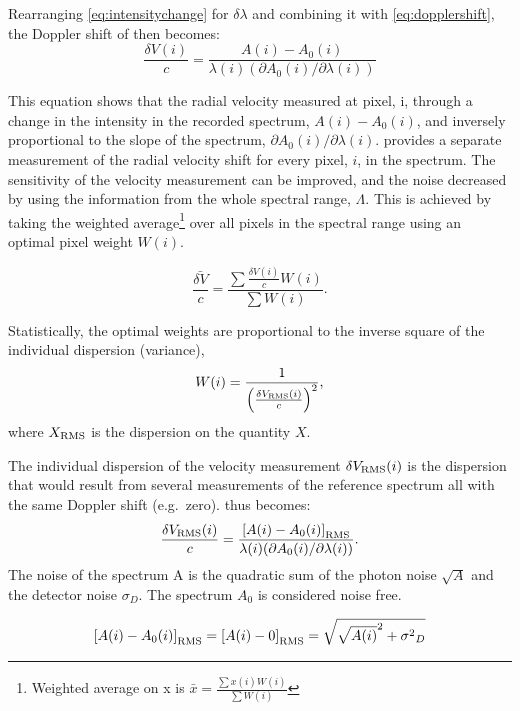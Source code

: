 Rearranging \cref{eq:intensitychange} for \(\delta \lambda\) and combining it with \cref{eq:dopplershift}, the Doppler shift of then becomes:
\begin{equation}
    \frac{\delta V(i)}{c} = \frac{A(i) - A_0(i) }{\lambda(i) (\partial A_0(i)/\partial \lambda(i))} \label{eq:delta_v_i}
\end{equation}

This equation shows that the radial velocity measured at pixel, i, through a change in the intensity in the recorded spectrum, \(A(i)-A_0(i)\), and inversely proportional to the slope of the spectrum, \({\partial A_0(i)}/{\partial \lambda(i)}\).
 provides a separate measurement of the radial velocity shift for every pixel, $i$, in the spectrum.
The sensitivity of the velocity measurement can be improved, and the noise decreased by using the information from the whole  spectral range, \(\Lambda\).
This is achieved by taking the weighted average\footnote{Weighted average on x is \(\bar{x} = \frac{\sum{ x(i)W(i)}}{\sum {W(i)}}\)} over all pixels in the spectral range using an optimal pixel weight \(W(i)\).

\begin{equation}
\bar{\frac{\delta V}{c}} = \frac{\sum{\frac{\delta V(i)}{c}W(i)}}{\sum {W(i)}}.
\end{equation}

Statistically, the optimal weights are proportional to the inverse square of the individual dispersion (variance),
\begin{equation}
W(i) = \frac{1}{{\left(\frac{\delta V_{\textrm{RMS}}(i)}{c}\right)}^{2}}, \label{eq:weights}
\end{equation}
where \(X_{\textrm{RMS}}\) is the dispersion on the quantity \(X\).

The individual dispersion of the velocity measurement \(\delta V_{\textrm{RMS}}(i)\) is the dispersion that would result from several measurements of the reference spectrum all with the same Doppler shift (e.g.\ zero).  thus becomes:
\begin{equation}
    \frac{\delta V_{\textrm{RMS}}(i)}{c} = \frac{{[A(i) - A_0(i)]}_{\textrm{RMS}} }{\lambda(i) (\partial A_0(i)/\partial \lambda(i))}. \label{eq:delta_v_i_rms}
\end{equation}
The noise of the spectrum A is the quadratic sum of the photon noise \(\sqrt{A}\) and the detector noise \(\sigma_D\).
The spectrum \(A_0\) is considered noise free.

\begin{equation}
{[{A(i)-A_0(i)}]}_{\textrm{RMS}} = {[{A(i)} - 0]}_{\textrm{RMS}} = \sqrt{{\sqrt{A(i)}}^{2} + {{\sigma}^{2}}_{D}} \label{eq:noise}
\end{equation}

